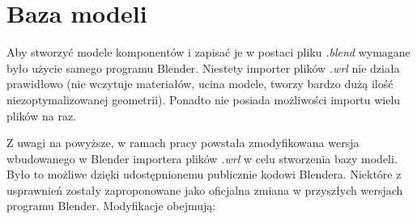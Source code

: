 \documentclass{xmgr}
\begin{document}
\section {Baza modeli\label{wrl}}

Aby stworzyć modele komponentów i zapisać je w postaci pliku \emph{.blend} wymagane było użycie samego programu Blender. Niestety importer plików \emph{.wrl} nie działa prawidłowo (nie wczytuje materiałów, ucina modele, tworzy bardzo dużą ilość niezoptymalizowanej geometrii). Ponadto nie posiada możliwości importu wielu plików na raz.

Z uwagi na powyższe, w ramach pracy powstała zmodyfikowana wersja wbudowanego w Blender importera plików \emph{.wrl} w celu stworzenia bazy modeli. Było to możliwe dzięki udostępnionemu publicznie kodowi Blendera. Niektóre z usprawnień zostały zaproponowane jako oficjalna zmiana w przyszłych wersjach programu Blender. Modyfikacje obejmują:
\end{document}
